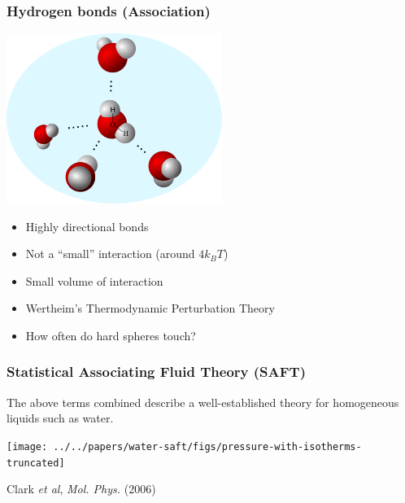 \begin{frame}
  \frametitle{Hydrogen bonds (Association)}
  \vspace{-2em}
  \hfill\includegraphics[width=7cm]{figs/hydrogen-bonds}\hspace{-3em}
  \vspace{-2em}
  \begin{itemize}
  \item Highly directional bonds
  \item Not a ``small'' interaction (around $4k_BT$)
  \item Small volume of interaction
  \item Wertheim's Thermodynamic Perturbation Theory\\ \hfill
  \item How often do hard spheres touch?
  \end{itemize}
\end{frame}

\begin{frame}
  \frametitle{Statistical Associating Fluid Theory (SAFT)}
  The above terms combined describe a well-established
  theory for homogeneous liquids such as water.
  \begin{center}
    \vspace{-1em}
    \texttt{[image: ../../papers/water-saft/figs/pressure-with-isotherms-truncated]}
  \end{center}
  \hfill Clark \emph{et al}, \emph{Mol. Phys.}
  (2006)
\end{frame}

